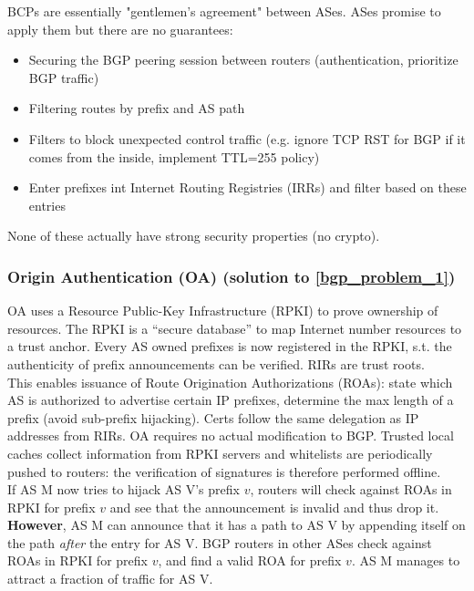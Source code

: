 \documentclass[11pt,oneside,a4paper]{article}
\begin{document}
BCPs are essentially "gentlemen's agreement" between ASes. ASes promise to apply them but there are no guarantees:

\vspace{-\topsep}
\begin{itemize}
	\setlength{\itemsep}{0pt}
	\setlength{\parskip}{0pt}
	\item Securing the BGP peering session between routers (authentication, prioritize BGP traffic)
	\item Filtering routes by prefix and AS path
	\item Filters to block unexpected control traffic (e.g. ignore TCP RST for BGP if it comes from the inside, implement TTL=255 policy)
	\item Enter prefixes int Internet Routing Registries (IRRs) and filter based on these entries
\end{itemize}
\vspace{-\topsep}

None of these actually have strong security properties (no crypto).

\subsubsection{Origin Authentication (OA) (solution to \ref{bgp_problem_1})}

OA uses a Resource Public-Key Infrastructure (RPKI) to prove ownership of resources. The RPKI is a “secure database” to map Internet number resources to a trust anchor. Every AS owned prefixes is now registered in the RPKI, s.t. the authenticity of prefix announcements can be verified. 
RIRs are trust roots.\\
This enables issuance of Route Origination Authorizations (ROAs): state which AS is authorized to advertise certain IP prefixes, determine the max length of a prefix (avoid sub-prefix hijacking). Certs follow the same delegation as IP addresses from RIRs. OA requires no actual modification to BGP. Trusted local caches collect information from RPKI servers and whitelists are periodically pushed to routers: the verification of signatures is therefore performed offline.\\

If AS M now tries to hijack AS V's prefix $v$, routers will check against ROAs in RPKI for prefix $v$ and see that the announcement is invalid and thus drop it.\\
\textbf{However}, AS M can announce that it has a path to AS V by appending itself on the path \textit{after} the entry for AS V. BGP routers in other ASes check against ROAs in RPKI for prefix $v$, and find a valid ROA for prefix $v$. AS M manages to attract a fraction of traffic for AS V.
\end{document}
